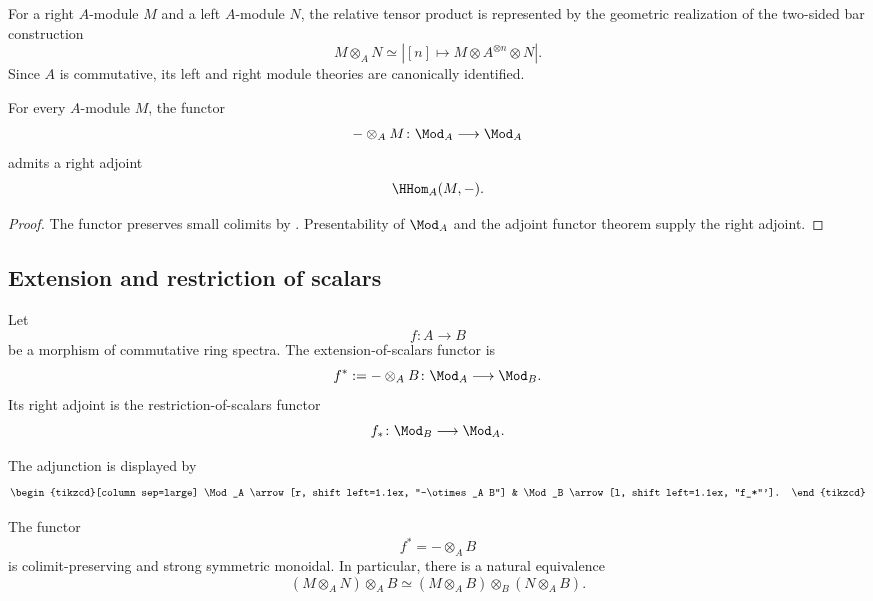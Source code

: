 \begin{construction}
\label{con:spectral-relative-tensor-product}
For a right $A$-module $M$ and a left $A$-module $N$, the relative tensor
product is represented by the geometric realization of the two-sided bar
construction
\[
    M\otimes_A N
    \simeq
    \left|
        [n]
        \longmapsto
        M\otimes A^{\otimes n}\otimes N
    \right|.
\]
Since $A$ is commutative, its left and right module theories are
canonically identified.
\end{construction}

\begin{proposition}
\label{prop:module-spectra-closedness}
For every $A$-module $M$, the functor
\[
    -\otimes_A M
    \colon
    \Mod_A
    \longrightarrow
    \Mod_A
\]
admits a right adjoint
\[
    \HHom_A(M,-).
\]
\end{proposition}

\begin{proof}
The functor preserves small colimits by
. Presentability of $\Mod_A$ and the
adjoint functor theorem supply the right adjoint.
\end{proof}

\subsection{Extension and restriction of scalars}

\begin{definition}
\label{def:spectral-extension-restriction-scalars}
Let
\[
    f
    \colon
    A
    \longrightarrow
    B
\]
be a morphism of commutative ring spectra. The extension-of-scalars
functor is
\[
    f^*
    :=
    -\otimes_A B
    \colon
    \Mod_A
    \longrightarrow
    \Mod_B.
\]
Its right adjoint is the restriction-of-scalars functor
\[
    f_*
    \colon
    \Mod_B
    \longrightarrow
    \Mod_A.
\]
\end{definition}

The adjunction is displayed by
\[
\begin{tikzcd}[column sep=large]
    \Mod_A
        \arrow[r, shift left=1.1ex, "-\otimes_A B"]
    &
    \Mod_B
        \arrow[l, shift left=1.1ex, "f_*"'].
\end{tikzcd}
\]

\begin{proposition}
\label{prop:spectral-base-change-monoidal}
The functor
\[
    f^*
    =
    -\otimes_A B
\]
is colimit-preserving and strong symmetric monoidal. In particular, there
is a natural equivalence
\[
    (M\otimes_A N)\otimes_A B
    \simeq
    (M\otimes_A B)
    \otimes_B
    (N\otimes_A B).
\]
\end{proposition}

